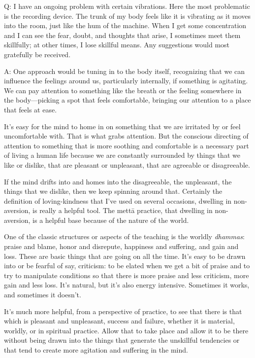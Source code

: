 \qaspace
Q: I have an ongoing problem with certain vibrations. Here the most
problematic is the recording device. The trunk of my body feels like it
is vibrating as it moves into the room, just like the hum of the
machine. When I get some concentration and I can see the fear, doubt,
and thoughts that arise, I sometimes meet them skillfully; at other
times, I lose skillful means. Any suggestions would most gratefully be
received.

\qaspace
A: One approach would be tuning in to the body itself, recognizing that
we can influence the feelings around us, particularly internally, if
something is agitating. We can pay attention to something like the
breath or the feeling somewhere in the body—picking a spot that feels
comfortable, bringing our attention to a place that feels at ease.

It’s easy for the mind to home in on something that we are irritated by
or feel uncomfortable with. That is what grabs attention. But the
conscious directing of attention to something that is more soothing and
comfortable is a necessary part of living a human life because we are
constantly surrounded by things that we like or dislike, that are
pleasant or unpleasant, that are agreeable or disagreeable.

If the mind drifts into and homes into the disagreeable, the unpleasant,
the things that we dislike, then we keep spinning around that. Certainly
the definition of loving-kindness that I’ve used on several occasions,
dwelling in non-aversion, is really a helpful tool. The mettā practice,
that dwelling in non-aversion, is a helpful base because of the nature
of the world.

One of the classic structures or aspects of the teaching is the worldly
\emph{dhammas}: praise and blame, honor and disrepute, happiness and
suffering, and gain and loss. These are basic things that are going on
all the time. It’s easy to be drawn into or be fearful of say,
criticism: to be elated when we get a bit of praise and to try to
manipulate conditions so that there is more praise and less criticism,
more gain and less loss. It’s natural, but it’s also energy intensive.
Sometimes it works, and sometimes it doesn’t.

It’s much more helpful, from a perspective of practice, to see that
there is that which is pleasant and unpleasant, success and failure,
whether it is material, worldly, or in spiritual practice. Allow that to
take place and allow it to be there without being drawn into the things
that generate the unskillful tendencies or that tend to create more
agitation and suffering in the mind.

